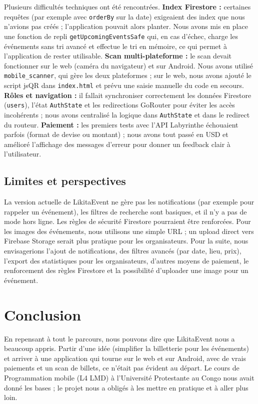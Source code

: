 \documentclass[11pt,a4paper,oneside]{article}
\begin{document}
Plusieurs difficultés techniques ont été rencontrées. \textbf{Index Firestore :} certaines requêtes (par exemple avec \texttt{orderBy} sur la date) exigeaient des index que nous n'avions pas créés ; l'application pouvait alors planter. Nous avons mis en place une fonction de repli \texttt{getUpcomingEventsSafe} qui, en cas d'échec, charge les événements sans tri avancé et effectue le tri en mémoire, ce qui permet à l'application de rester utilisable. \textbf{Scan multi-plateforme :} le scan devait fonctionner sur le web (caméra du navigateur) et sur Android. Nous avons utilisé \texttt{mobile\_scanner}, qui gère les deux plateformes ; sur le web, nous avons ajouté le script jsQR dans \texttt{index.html} et prévu une saisie manuelle du code en secours. \textbf{Rôles et navigation :} il fallait synchroniser correctement les données Firestore (\texttt{users}), l'état \texttt{AuthState} et les redirections GoRouter pour éviter les accès incohérents ; nous avons centralisé la logique dans \texttt{AuthState} et dans le redirect du routeur. \textbf{Paiement :} les premiers tests avec l'API Labyrinthe échouaient parfois (format de devise ou montant) ; nous avons tout passé en USD et amélioré l'affichage des messages d'erreur pour donner un feedback clair à l'utilisateur.

\subsection{Limites et perspectives}

La version actuelle de LikitaEvent ne gère pas les notifications (par exemple pour rappeler un événement), les filtres de recherche sont basiques, et il n'y a pas de mode hors ligne. Les règles de sécurité Firestore pourraient être renforcées. Pour les images des événements, nous utilisons une simple URL ; un upload direct vers Firebase Storage serait plus pratique pour les organisateurs. Pour la suite, nous envisagerions l'ajout de notifications, des filtres avancés (par date, lieu, prix), l'export des statistiques pour les organisateurs, d'autres moyens de paiement, le renforcement des règles Firestore et la possibilité d'uploader une image pour un événement.

\section*{Conclusion}

En repensant à tout le parcours, nous pouvons dire que LikitaEvent nous a beaucoup appris. Partir d'une idée (simplifier la billetterie pour les événements) et arriver à une application qui tourne sur le web et sur Android, avec de vrais paiements et un scan de billets, ce n'était pas évident au départ. Le cours de Programmation mobile (L4 LMD) à l'Université Protestante au Congo nous avait donné les bases ; le projet nous a obligés à les mettre en pratique et à aller plus loin.
\end{document}
